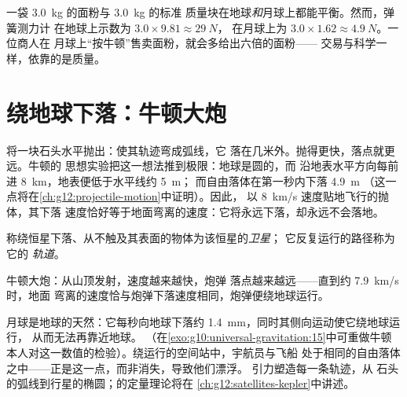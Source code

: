 \begin{example}[月球上的面粉]\label{ex:g10:universal-gravitation:flour}
一袋 \qty{3.0}{kg} 的面粉与 \qty{3.0}{kg} 的标准
质量块在地球\emph{和}月球上都能平衡。然而，弹簧测力计
在地球上示数为 $3.0 \times 9.81 \approx \qty{29}{N}$，
在月球上为 $3.0 \times 1.62 \approx \qty{4.9}{N}$。一位商人在
月球上“按牛顿”售卖面粉，就会多给出六倍的面粉——
交易与科学一样，依靠的是质量。
\end{example}

\section{绕地球下落：牛顿大炮}

将一块石头水平抛出：使其轨迹弯成弧线，它
落在几米外。抛得更快，落点就更远。牛顿的
思想实验把这一想法推到极限：地球是圆的，而
沿地表水平方向每前进 \qty{8}{km}，地表便低于水平线约 \qty{5}{m}；
而自由落体在第一秒内下落 \qty{4.9}{m}
（这一点将在\cref{ch:g12:projectile-motion}中证明）。因此，
以 \qty{8}{km/s} 速度贴地飞行的抛体，其下落
速度恰好等于地面弯离的速度：它将永远下落，却永远不会落地。

\begin{definition}[卫星与轨道]\label{def:g10:universal-gravitation:satellite}
称绕恒星下落、从不触及其表面的物体为该恒星的\emph{卫星}；
它反复运行的路径称为它的
\emph{轨道}。
\end{definition}

\begin{omfigure}

{\small 牛顿大炮：从山顶发射，速度越来越快，炮弹
落点越来越远——直到约 \qty{7.9}{km/s} 时，地面
弯离的速度恰与炮弹下落速度相同，炮弹便绕地球运行。}
\end{omfigure}

\begin{remark}[月球是一块下落的石头]\label{rem:g10:universal-gravitation:fallingmoon}
月球是地球的天然：它每秒向地球下落约
\qty{1.4}{mm}，同时其侧向运动使它绕地球运行，
从而无法再靠近地球。
（在\cref{exo:g10:universal-gravitation:15}中可重做牛顿
本人对这一数值的检验）。绕运行的空间站中，宇航员与飞船
处于相同的自由落体之中——正是这一点，而非消失，导致他们漂浮。
引力塑造每一条轨迹，从
石头的弧线到行星的椭圆；的定量理论将在
\cref{ch:g12:satellites-kepler}中讲述。
\end{remark}

